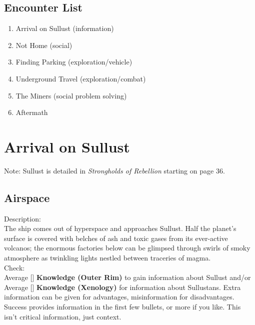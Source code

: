 \documentclass{book}
\newcommand{\df}{\difficulty}
\begin{document}
\begin{multicols*}{2}
\subsection{Encounter List}
\begin{enumerate}
    \item Arrival on Sullust (information)
    \item Not Home (social)
    \item Finding Parking (exploration/vehicle)
    \item Underground Travel (exploration/combat)
    \item The Miners (social problem solving)
    \item Aftermath
\end{enumerate}

\section{Arrival on Sullust}

    Note: Sullust is detailed in \emph{Strongholds of Rebellion} starting on page 36.

\subsection{Airspace}

Description:\\
The ship comes out of hyperspace and approaches Sullust. Half the planet’s surface is covered with belches of ash and toxic gases from its ever-active volcanos; the enormous factories below can be glimpsed through swirls of smoky atmosphere as twinkling lights nestled between traceries of magma.\\
Check:\\
Average [\df\df] \textbf{Knowledge (Outer Rim)} to gain information about Sullust and/or Average [\df\df] \textbf{Knowledge (Xenology)} for information about Sullustans. Extra information can be given for advantages, misinformation for disadvantages. Success provides information in the first few bullets, or more if you like.  This isn't critical information, just context.\\


\end{multicols*}
\end{document}
